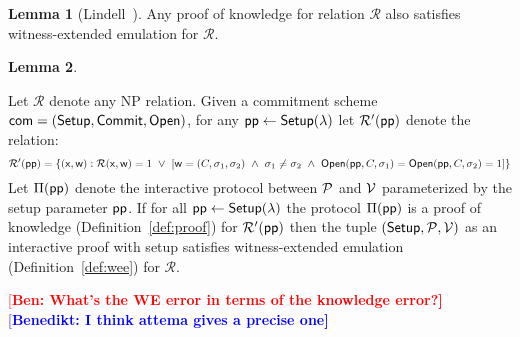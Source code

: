 \documentclass{article}
\theoremstyle{definition}
\newtheorem{lemma}{Lemma}
\newcommand{\ben}[1]{{\textcolor{red}{[\bf Ben: #1]}}}
\newcommand{\benedikt}[1]{{\textcolor{blue}{[\bf Benedikt: #1]}}}
\newcommand{\ben}[1]{}
\begin{document}
\begin{lemma}[Lindell~\cite{C:Lindell01}]\label{lem:wee}
	Any proof of knowledge for relation $\mathcal{R}$ also satisfies witness-extended emulation for $\mathcal{R}$.  
\end{lemma}

\begin{lemma}\label{lem:weecommit}

Let $\mathcal{R}$ denote any NP relation. Given a commitment scheme $\textsf{com} = (\textsf{{Setup}}, \textsf{{Commit}}, \textsf{{Open}})$, for any $\textsf{pp} \gets \textsf{{Setup}}(\lambda)$ let $\mathcal{R}'(\textsf{pp})$ denote the relation: 
$$\mathcal{R'}(\crs) = \{(\mathsf{x}, \mathsf{w}): \mathcal{R}(\mathsf{x}, \mathsf{w}) = 1 \  \vee \ \left[ \mathsf{w} = (C, \sigma_1, \sigma_2) \ \wedge \ \sigma_1 \neq \sigma_2 \ \wedge \ \open(\crs, C, \sigma_1) = \open(\crs, C, \sigma_2) = 1 \right]   \} $$
Let $\Pi(\textsf{pp})$ denote the interactive protocol between $\mathcal{P}$ and $\mathcal{V}$ parameterized by the setup parameter $\textsf{pp}$. If for all $\textsf{pp} \gets  \textsf{{Setup}}(\lambda)$ the protocol $\Pi(\textsf{pp})$ is a proof of knowledge (Definition~\ref{def:proof}) for $\mathcal{R}'(\textsf{pp})$ then the tuple $(\textsf{{Setup}}, \mathcal{P}, \mathcal{V})$ as an interactive proof with setup satisfies witness-extended emulation (Definition~\ref{def:wee}) for $\mathcal{R}$. 	
\end{lemma}
\ben{What's the WE error in terms of the knowledge error?} 
\benedikt{I think attema gives a precise one}
\end{document}
